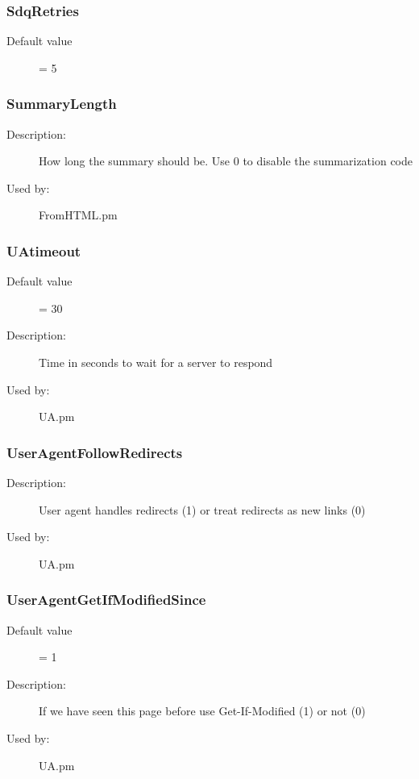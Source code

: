 \subsubsection{SdqRetries}
\label{SdqRetries}
\begin{description}
\item[Default value] = 5
\end{description}
\subsubsection{SummaryLength}
\label{SummaryLength}
\begin{description}
\item[Description:] How long the summary should be. Use 0 to disable the summarization code
\item[Used by:] FromHTML.pm
\end{description}
\subsubsection{UAtimeout}
\label{UAtimeout}
\begin{description}
\item[Default value] = 30
\item[Description:] Time in seconds to wait for a server to respond
\item[Used by:] UA.pm
\end{description}
\subsubsection{UserAgentFollowRedirects}
\label{UserAgentFollowRedirects}
\begin{description}
\item[Description:] User agent handles redirects (1) or treat redirects as new links (0)
\item[Used by:] UA.pm
\end{description}
\subsubsection{UserAgentGetIfModifiedSince}
\label{UserAgentGetIfModifiedSince}
\begin{description}
\item[Default value] = 1
\item[Description:] If we have seen this page before use Get-If-Modified (1) or not (0)
\item[Used by:] UA.pm
\end{description}
